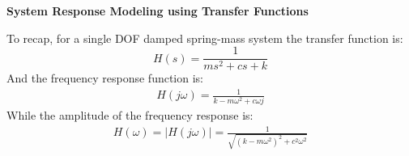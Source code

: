 \documentclass[12pt,letter]{article}
\begin{document}
\begin{review}
	
	\textbf{System Response Modeling using Transfer Functions} 

	\noindent To recap, for a single DOF damped spring-mass system the transfer function is:
	\begin{equation}
	H(s) = \frac{1}{ms^2+cs+k}
	\end{equation}
	And the frequency response function is: 
	\begin{eqnarray}
	H(j\omega) = \frac{1}{k-m\omega^2+c\omega j}
	\end{eqnarray}
	While the amplitude of the frequency response is:
	\begin{eqnarray}
	H(\omega) = |H(j\omega)| = \frac{1}{\sqrt{(k-m\omega^2)^2+c^2\omega^2}}
	\end{eqnarray}
\end{review}
			\vspace{-2ex}
\end{document}
